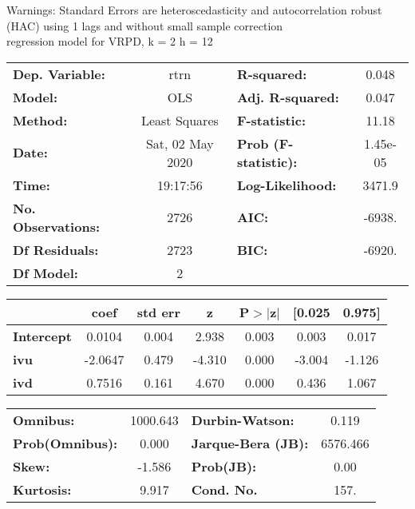 Warnings: \newline
 [1] Standard Errors are heteroscedasticity and autocorrelation robust (HAC) using 1 lags and without small sample correction\\ 

regression model for VRPD, k = 2 h = 12\begin{center}
\begin{tabular}{lclc}
\toprule
\textbf{Dep. Variable:}    &       rtrn       & \textbf{  R-squared:         } &     0.048   \\
\textbf{Model:}            &       OLS        & \textbf{  Adj. R-squared:    } &     0.047   \\
\textbf{Method:}           &  Least Squares   & \textbf{  F-statistic:       } &     11.18   \\
\textbf{Date:}             & Sat, 02 May 2020 & \textbf{  Prob (F-statistic):} &  1.45e-05   \\
\textbf{Time:}             &     19:17:56     & \textbf{  Log-Likelihood:    } &    3471.9   \\
\textbf{No. Observations:} &        2726      & \textbf{  AIC:               } &    -6938.   \\
\textbf{Df Residuals:}     &        2723      & \textbf{  BIC:               } &    -6920.   \\
\textbf{Df Model:}         &           2      & \textbf{                     } &             \\
\bottomrule
\end{tabular}
\begin{tabular}{lcccccc}
                   & \textbf{coef} & \textbf{std err} & \textbf{z} & \textbf{P$> |$z$|$} & \textbf{[0.025} & \textbf{0.975]}  \\
\midrule
\textbf{Intercept} &       0.0104  &        0.004     &     2.938  &         0.003        &        0.003    &        0.017     \\
\textbf{ivu}       &      -2.0647  &        0.479     &    -4.310  &         0.000        &       -3.004    &       -1.126     \\
\textbf{ivd}       &       0.7516  &        0.161     &     4.670  &         0.000        &        0.436    &        1.067     \\
\bottomrule
\end{tabular}
\begin{tabular}{lclc}
\textbf{Omnibus:}       & 1000.643 & \textbf{  Durbin-Watson:     } &    0.119  \\
\textbf{Prob(Omnibus):} &   0.000  & \textbf{  Jarque-Bera (JB):  } & 6576.466  \\
\textbf{Skew:}          &  -1.586  & \textbf{  Prob(JB):          } &     0.00  \\
\textbf{Kurtosis:}      &   9.917  & \textbf{  Cond. No.          } &     157.  \\
\bottomrule
\end{tabular}
\end{center}

